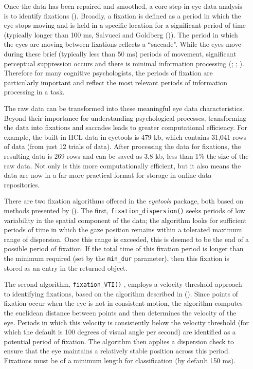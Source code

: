 \documentclass[
  man,
  floatsintext,
  longtable,
  nolmodern,
  notxfonts,
  notimes,
  colorlinks=true,linkcolor=blue,citecolor=blue,urlcolor=blue]{apa7}
\begin{document}
Once the data has been repaired and smoothed, a core step in eye data
analysis is to identify fixations (). Broadly, a fixation is defined as a period in which
the eye stops moving and is held in a specific location for a
significant period of time (typically longer than 100 ms, Salvucci and
Goldberg ()). The period in which the
eyes are moving between fixations reflects a ``saccade''. While the eyes
move during these brief (typically less than 50 ms) periods of movement,
significant perceptual suppression occurs and there is minimal
information processing (; ;
). Therefore for
many cognitive psychologists, the periods of fixation are particularly
important and reflect the most relevant periods of information
processing in a task.

The raw data can be transformed into these meaningful eye data
characteristics. Beyond their importance for understanding psychological
processes, transforming the data into fixations and saccades leads to
greater computational efficiency. For example, the built in HCL data in
eyetools is 479 kb, which contains 31,041 rows of data (from just 12
trials of data). After processing the data for fixations, the resulting
data is 269 rows and can be saved as 3.8 kb, less than 1\% the size of
the raw data. Not only is this more computationally efficient, but it
also means the data are now in a far more practical format for storage
in online data repositories.

There are two fixation algorithms offered in the \emph{eyetools}
package, both based on methods presented by
(). The first,
\texttt{fixation\_dispersion()} seeks periods of low variability in the
spatial component of the data; the algorithm looks for sufficient
periods of time in which the gaze position remains within a tolerated
maximum range of dispersion. Once this range is exceeded, this is deemed
to be the end of a possible period of fixation. If the total time of
this fixation period is longer than the minimum required (set by the
\texttt{min\_dur} parameter), then this fixation is stored as an entry
in the returned object.

The second algorithm, \texttt{fixation\_VTI()} , employs a
velocity-threshold approach to identifying fixations, based on the
algorithm described in (). Since points of fixation occur when the eye is not in
consistent motion, the algorithm computes the euclidean distance between
points and then determines the velocity of the eye. Periods in which
this velocity is consistently below the velocity threshold (for which
the default is 100 degrees of visual angle per second) are identified as
a potential period of fixation. The algorithm then applies a dispersion
check to ensure that the eye maintains a relatively stable position
across this period. Fixations must be of a minimum length for
classification (by default 150 ms).
\end{document}
